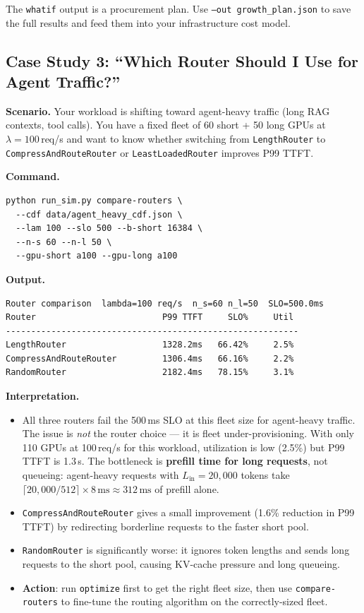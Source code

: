 \documentclass[11pt,a4paper]{article}
\begin{document}
\begin{keyinsight}
  The \texttt{whatif} output is a procurement plan.  Use
  \texttt{--out growth\_plan.json} to save the full results and feed
  them into your infrastructure cost model.
\end{keyinsight}

\subsection{Case Study 3: ``Which Router Should I Use for Agent Traffic?''}
\label{sec:cs-routers}

\textbf{Scenario.}  Your workload is shifting toward agent-heavy
traffic (long RAG contexts, tool calls).  You have a fixed fleet
of 60 short + 50 long GPUs at $\lambda = 100$\,req/s and want to
know whether switching from \texttt{LengthRouter} to
\texttt{CompressAndRouteRouter} or \texttt{LeastLoadedRouter}
improves P99 TTFT.

\textbf{Command.}
\begin{lstlisting}[style=shell]
python run_sim.py compare-routers \
  --cdf data/agent_heavy_cdf.json \
  --lam 100 --slo 500 --b-short 16384 \
  --n-s 60 --n-l 50 \
  --gpu-short a100 --gpu-long a100
\end{lstlisting}

\textbf{Output.}
\begin{lstlisting}[style=output]
Router comparison  lambda=100 req/s  n_s=60 n_l=50  SLO=500.0ms
Router                         P99 TTFT     SLO%     Util
----------------------------------------------------------
LengthRouter                   1328.2ms   66.42%     2.5%
CompressAndRouteRouter         1306.4ms   66.16%     2.2%
RandomRouter                   2182.4ms   78.15%     3.1%
\end{lstlisting}

\textbf{Interpretation.}
\begin{itemize}[nosep]
  \item All three routers fail the 500\,ms SLO at this fleet size
    for agent-heavy traffic.  The issue is \emph{not} the router
    choice --- it is fleet under-provisioning.  With only 110 GPUs
    at 100\,req/s for this workload, utilization is low (2.5\%) but
    P99 TTFT is 1.3\,s.  The bottleneck is \textbf{prefill time for
    long requests}, not queueing: agent-heavy requests with
    $L_{\text{in}} = 20{,}000$ tokens take
    $\lceil 20{,}000/512 \rceil \times 8\,\text{ms} \approx 312\,\text{ms}$
    of prefill alone.
  \item \texttt{CompressAndRouteRouter} gives a small improvement
    (1.6\% reduction in P99 TTFT) by redirecting borderline requests
    to the faster short pool.
  \item \texttt{RandomRouter} is significantly worse: it ignores
    token lengths and sends long requests to the short pool, causing
    KV-cache pressure and long queueing.
  \item \textbf{Action}: run \texttt{optimize} first to get the right
    fleet size, then use \texttt{compare-routers} to fine-tune the
    routing algorithm on the correctly-sized fleet.
\end{itemize}
\end{document}
